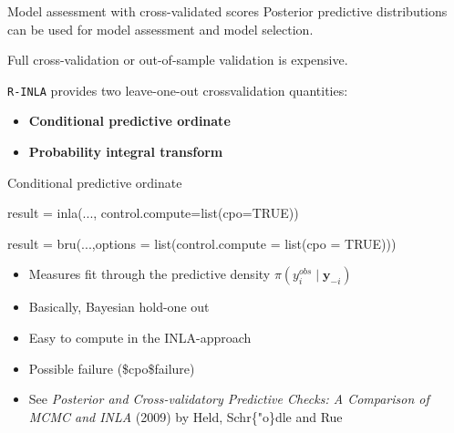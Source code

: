 \documentclass[
  ignorenonframetext,
]{beamer}
\newenvironment{Shaded}{\begin{snugshade}}{\end{snugshade}}
\newcommand{\AttributeTok}[1]{\textcolor[rgb]{0.77,0.63,0.00}{#1}}
\newcommand{\ConstantTok}[1]{\textcolor[rgb]{0.00,0.00,0.00}{#1}}
\newcommand{\FunctionTok}[1]{\textcolor[rgb]{0.00,0.00,0.00}{#1}}
\newcommand{\NormalTok}[1]{#1}
\newcommand{\OtherTok}[1]{\textcolor[rgb]{0.56,0.35,0.01}{#1}}
\begin{document}
\begin{frame}[fragile]{Model assessment with cross-validated scores}
\protect\hypertarget{model-assessment-with-cross-validated-scores}{}
Posterior predictive distributions can be used for model assessment and
model selection.

Full cross-validation or out-of-sample validation is expensive.

\texttt{R-INLA} provides two leave-one-out crossvalidation quantities:

\begin{itemize}
\item
  \textbf{Conditional predictive ordinate}
\item
  \textbf{Probability integral transform}
\end{itemize}
\end{frame}

\begin{frame}[fragile]{Conditional predictive ordinate}
\protect\hypertarget{conditional-predictive-ordinate}{}
\small

\begin{Shaded}
\begin{Highlighting}[]
\NormalTok{result }\OtherTok{=} \FunctionTok{inla}\NormalTok{(...,}
              \AttributeTok{control.compute=}\FunctionTok{list}\NormalTok{(}\AttributeTok{cpo=}\ConstantTok{TRUE}\NormalTok{))}

\NormalTok{result }\OtherTok{=} \FunctionTok{bru}\NormalTok{(...,}\AttributeTok{options =} \FunctionTok{list}\NormalTok{(}\AttributeTok{control.compute =} 
                                  \FunctionTok{list}\NormalTok{(}\AttributeTok{cpo =} \ConstantTok{TRUE}\NormalTok{)))}
\end{Highlighting}
\end{Shaded}

\normalsize

\begin{itemize}
\item
  Measures fit through the predictive density
  \(\pi(y_i^{obs}\mid\boldsymbol{y}_{-i})\)
\item
  Basically, Bayesian hold-one out
\item
  Easy to compute in the INLA-approach
\item
  Possible failure (\$cpo\$failure)
\item
  See \emph{Posterior and Cross-validatory Predictive Checks: A
  Comparison of MCMC and INLA} (2009) by Held, Schr\{"o\}dle and Rue
\end{itemize}
\end{frame}
\end{document}
